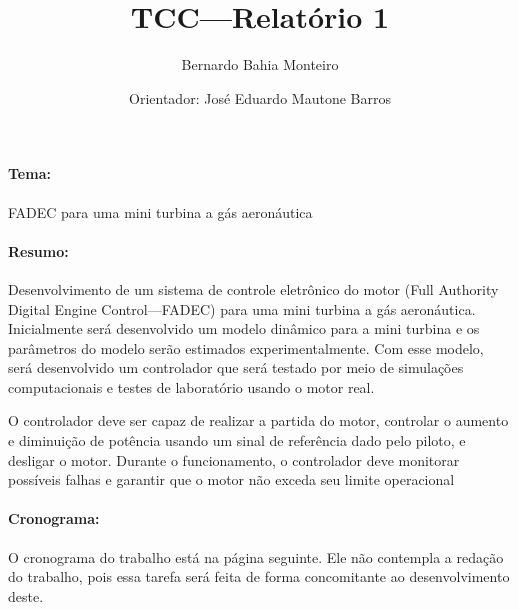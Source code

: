\documentclass[a4paper,12pt]{article}
\title{TCC---Relatório 1}
\author{Bernardo Bahia Monteiro \and Orientador: José Eduardo Mautone Barros}
\begin{document}
\maketitle

\paragraph{Tema:} FADEC para uma mini turbina a gás aeronáutica

\paragraph{Resumo:} Desenvolvimento de um sistema de controle eletrônico do
motor (Full Authority Digital Engine Control---FADEC) para uma mini turbina a
gás aeronáutica. Inicialmente será desenvolvido um modelo dinâmico para a mini
turbina e os parâmetros do modelo serão estimados experimentalmente. Com esse
modelo, será desenvolvido um controlador que será testado por meio de simulações
computacionais e testes de laboratório usando o motor real.

O controlador deve ser capaz de realizar a partida do motor, controlar o aumento
e diminuição de potência usando um sinal de referência dado pelo piloto, e
desligar o motor. Durante o funcionamento, o controlador deve monitorar
possíveis falhas e garantir que o motor não exceda seu limite operacional

\paragraph{Cronograma:} O cronograma do trabalho está na página seguinte. Ele
não contempla a redação do trabalho, pois essa tarefa será feita de forma
concomitante ao desenvolvimento deste.


\end{document}
